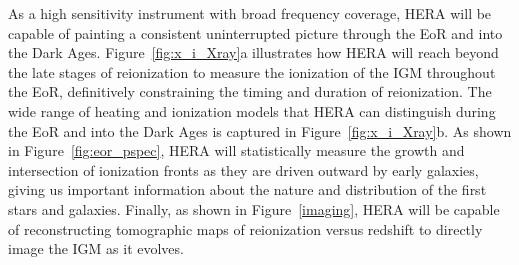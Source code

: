 \documentclass[preprint]{aastex}
\begin{document}
As a high sensitivity instrument with broad frequency coverage, HERA will be
capable of painting a consistent uninterrupted picture through the EoR and into
the Dark Ages.
Figure~\ref{fig:x_i_Xray}a illustrates how HERA will
reach beyond the late stages of reionization to measure the
ionization of the IGM throughout the EoR, definitively constraining the timing
and duration of reionization.
The wide range of heating and ionization models that HERA
can distinguish during the EoR and into the Dark Ages is captured in
Figure~\ref{fig:x_i_Xray}b.  
As shown in Figure~\ref{fig:eor_pspec},
HERA will statistically measure the growth and intersection
of ionization fronts as they are driven outward by early galaxies, giving
us important information about the nature and distribution of the first stars and galaxies.
Finally, as shown in Figure~\ref{imaging}, HERA will be capable of reconstructing
tomographic maps of reionization versus redshift to directly image the IGM as
it evolves.
\end{document}
